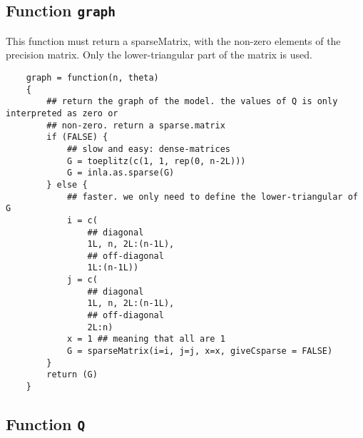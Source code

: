 \documentclass[a4paper,11pt]{article}
\begin{document}
\subsection*{Function \texttt{graph}}

This function must return a sparseMatrix, with the non-zero elements
of the precision matrix. Only the lower-triangular part of the matrix
is used. 
{\small
\begin{verbatim}
    graph = function(n, theta)
    {
        ## return the graph of the model. the values of Q is only interpreted as zero or
        ## non-zero. return a sparse.matrix
        if (FALSE) {
            ## slow and easy: dense-matrices
            G = toeplitz(c(1, 1, rep(0, n-2L)))
            G = inla.as.sparse(G)
        } else {
            ## faster. we only need to define the lower-triangular of G
            i = c(
                ## diagonal
                1L, n, 2L:(n-1L),
                ## off-diagonal
                1L:(n-1L))
            j = c(
                ## diagonal
                1L, n, 2L:(n-1L),
                ## off-diagonal
                2L:n)
            x = 1 ## meaning that all are 1
            G = sparseMatrix(i=i, j=j, x=x, giveCsparse = FALSE)
        }            
        return (G)
    }
\end{verbatim}
}

\subsection*{Function \texttt{Q}}
\end{document}
